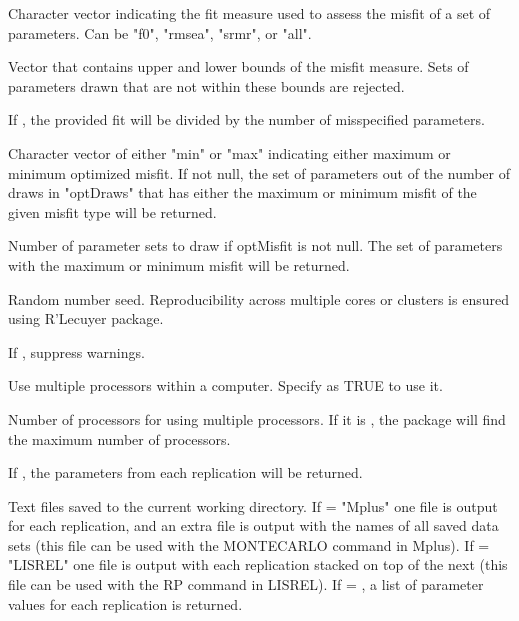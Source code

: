 \documentclass[a4paper]{book}
\begin{document}
\begin{Arguments}
\begin{ldescription}
\item[\code{misfitType}]  
Character vector indicating the fit measure used to assess the misfit of a set of parameters. Can be "f0", "rmsea", "srmr", or "all". 

\item[\code{misfitBounds}]  
Vector that contains upper and lower bounds of the misfit measure. Sets of parameters drawn that are not within these bounds are rejected.

\item[\code{averageNumMisspec}]  
If , the provided fit will be divided by the number of misspecified parameters. 

\item[\code{optMisfit}]  
Character vector of either "min" or "max" indicating either maximum or minimum optimized misfit. If not null, the set of parameters out of the number of draws in "optDraws" that has either the maximum or minimum misfit of the given misfit type will be returned.

\item[\code{optDraws}]  
Number of parameter sets to draw if optMisfit is not null. The set of parameters with the maximum or minimum misfit will be returned.

\item[\code{seed}]  
Random number seed. Reproducibility across multiple cores or clusters is ensured using R'Lecuyer package.

\item[\code{silent}]  
If , suppress warnings.

\item[\code{multicore}]  
Use multiple processors within a computer. Specify as TRUE to use it.

\item[\code{numProc}]  
Number of processors for using multiple processors. If it is , the package will find the maximum number of processors.

\item[\code{params}]  
If , the parameters from each replication will be returned.

\end{ldescription}
\end{Arguments}
%
\begin{Value}
Text files saved to the current working directory. If  = "Mplus" one file is output for each replication, and an extra file is output with the names of all saved data sets (this file can be used with the MONTECARLO command in Mplus). If  = "LISREL" one file is output with each replication stacked on top of the next (this file can be used with the RP command in LISREL). If  = , a list of parameter values for each replication is returned.
\end{Value}
\end{document}
